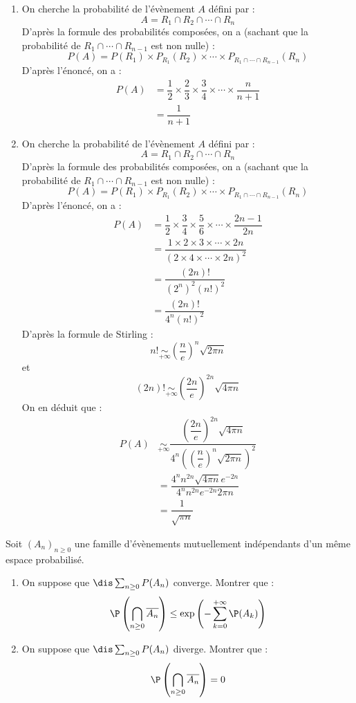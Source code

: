 \documentclass[a4paper,10pt]{report}
\begin{document}
\begin{enumerate}
\item On cherche la probabilité de l'évènement $A$ défini par :
$$ A = R_1 \cap R_2 \cap \cdots \cap R_n$$
D'après la formule des probabilités composées, on a (sachant que la probabilité de $R_1 \cap \cdots \cap R_{n-1}$ est non nulle) :
$$ P(A) = P(R_1) \times P_{R_1}(R_2) \times \cdots \times P_{R_1 \cap \cdots \cap R_{n-1}}(R_n)$$
D'après l'énoncé, on a :
\begin{align*}
P(A) & = \dfrac{1}{2} \times \dfrac{2}{3} \times \dfrac{3}{4} \times \cdots \times \dfrac{n}{n+1} \\
& = \dfrac{1}{n+1}
\end{align*}
\item On cherche la probabilité de l'évènement $A$ défini par :
$$ A = R_1 \cap R_2 \cap \cdots \cap R_n$$
D'après la formule des probabilités composées, on a (sachant que la probabilité de $R_1 \cap \cdots \cap R_{n-1}$ est non nulle) :
$$ P(A) = P(R_1) \times P_{R_1}(R_2) \times \cdots \times P_{R_1 \cap \cdots \cap R_{n-1}}(R_n)$$
D'après l'énoncé, on a :
\begin{align*}
P(A) & = \dfrac{1}{2} \times \dfrac{3}{4} \times \dfrac{5}{6} \times \cdots \times \dfrac{2n-1}{2n} \\
& = \dfrac{1 \times 2 \times 3 \times \cdots \times 2n}{(2 \times 4 \times \cdots \times 2n)^2} \\
& = \dfrac{(2n)!}{(2^n)^2 (n!)^2} \\
&= \dfrac{(2n)!}{4^n (n!)^2}
\end{align*}
D'après la formule de Stirling :
$$ n! \underset{+ \infty}{\sim} \left(\dfrac{n}{e} \right)^n \sqrt{2 \pi n}$$
et 
$$ (2n)! \underset{+ \infty}{\sim} \left(\dfrac{2n}{e} \right)^{2n} \sqrt{4 \pi n}$$
On en déduit que :
\begin{align*}
P(A) & \underset{+ \infty}{\sim} \dfrac{\left(\dfrac{2n}{e} \right)^{2n} \sqrt{4 \pi n}}{4^n \left(\left(\dfrac{n}{e} \right)^n \sqrt{2 \pi n}\right)^2} \\
& = \dfrac{4^n n^{2n} \sqrt{4 \pi n} e^{-2n}}{4^n n^{2n} e^{-2n}2\pi n} \\
& = \dfrac{1}{\sqrt{\pi n}}
\end{align*}
\end{enumerate}


\begin{Exa} Soit $(A_n)_{n \geq 0}$ une famille d'évènements mutuellement indépendants d'un même espace probabilisé.
\begin{enumerate}
\item On suppose que $\dis \sum_{n \geq 0} P(A_n)$ converge. Montrer que :
$$ \P \left( \bigcap_{n \geq 0} \overline{A_n} \right) \leq \exp \left(- \sum_{k=0}^{+ \infty} \P(A_k) \right)$$
\item On suppose que $\dis \sum_{n \geq 0} P(A_n)$ diverge. Montrer que :
$$ \P \left( \bigcap_{n \geq 0} \overline{A_n} \right) = 0$$
\end{enumerate}
\end{Exa}
\end{document}
